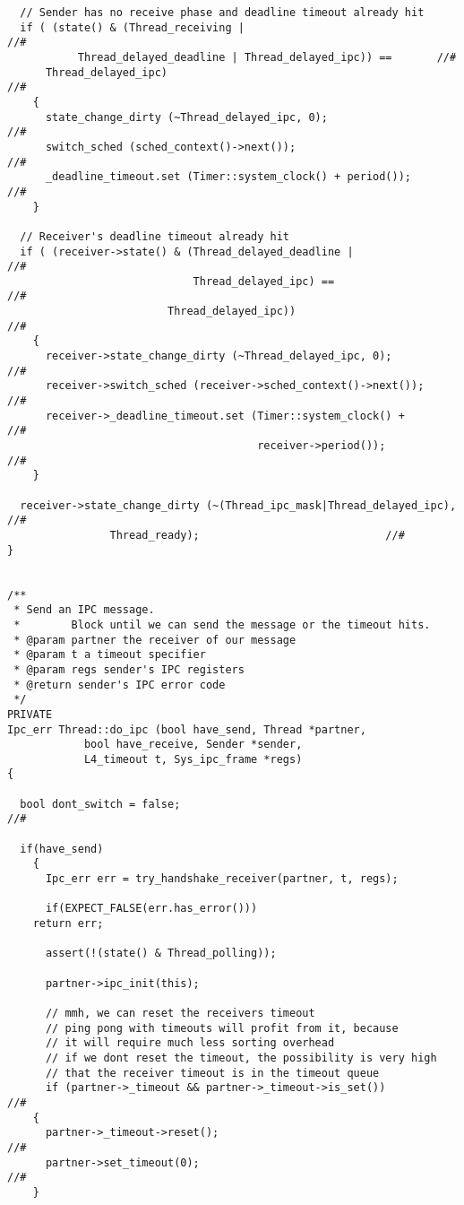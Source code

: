 \begin{lstlisting}
  // Sender has no receive phase and deadline timeout already hit
  if ( (state() & (Thread_receiving |                                      //#
		   Thread_delayed_deadline | Thread_delayed_ipc)) ==       //#
      Thread_delayed_ipc)                                                  //#
    {
      state_change_dirty (~Thread_delayed_ipc, 0);                         //#
      switch_sched (sched_context()->next());                              //#
      _deadline_timeout.set (Timer::system_clock() + period());            //#
    }

  // Receiver's deadline timeout already hit
  if ( (receiver->state() & (Thread_delayed_deadline |                     //#
                             Thread_delayed_ipc) ==                        //#
	                     Thread_delayed_ipc))                          //#
    {
      receiver->state_change_dirty (~Thread_delayed_ipc, 0);               //#
      receiver->switch_sched (receiver->sched_context()->next());          //#
      receiver->_deadline_timeout.set (Timer::system_clock() +             //#
                                       receiver->period());                //# 
    }

  receiver->state_change_dirty (~(Thread_ipc_mask|Thread_delayed_ipc),     //#
				Thread_ready);                             //#
}


/**
 * Send an IPC message.
 *        Block until we can send the message or the timeout hits.
 * @param partner the receiver of our message
 * @param t a timeout specifier
 * @param regs sender's IPC registers
 * @return sender's IPC error code
 */
PRIVATE
Ipc_err Thread::do_ipc (bool have_send, Thread *partner,
			bool have_receive, Sender *sender,
			L4_timeout t, Sys_ipc_frame *regs)
{

  bool dont_switch = false;                                                //#
  
  if(have_send)
    {
      Ipc_err err = try_handshake_receiver(partner, t, regs);
     
      if(EXPECT_FALSE(err.has_error()))
	return err;

      assert(!(state() & Thread_polling));                                 

      partner->ipc_init(this);      

      // mmh, we can reset the receivers timeout
      // ping pong with timeouts will profit from it, because
      // it will require much less sorting overhead
      // if we dont reset the timeout, the possibility is very high
      // that the receiver timeout is in the timeout queue
      if (partner->_timeout && partner->_timeout->is_set())                //#
	{
	  partner->_timeout->reset();                                      //#
	  partner->set_timeout(0);                                         //#
	}


\end{lstlisting}
